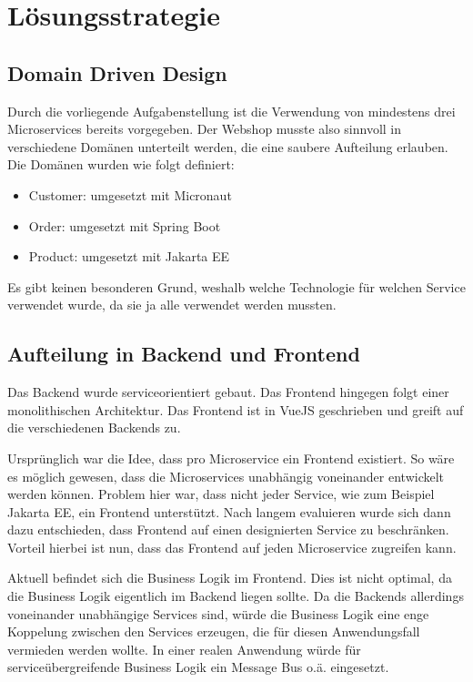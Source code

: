 
\section{Lösungsstrategie}
\label{sec:loesungsstrategie}

\subsection{Domain Driven Design}
Durch die vorliegende Aufgabenstellung ist die Verwendung von mindestens drei Microservices bereits vorgegeben. Der Webshop musste also sinnvoll in verschiedene
Domänen unterteilt werden, die eine saubere Aufteilung erlauben. Die Domänen wurden wie folgt definiert:
\begin{itemize}
    \item Customer: umgesetzt mit Micronaut
    \item Order: umgesetzt mit Spring Boot
    \item Product: umgesetzt mit Jakarta EE
\end{itemize}
    
Es gibt keinen besonderen Grund, weshalb welche Technologie für welchen Service verwendet wurde, da sie ja alle verwendet werden mussten.

\subsection{Aufteilung in Backend und Frontend}
Das Backend wurde serviceorientiert gebaut. Das Frontend hingegen folgt einer monolithischen Architektur. Das Frontend ist in VueJS geschrieben und greift auf die verschiedenen Backends zu.

Ursprünglich war die Idee, dass pro Microservice ein Frontend existiert. So wäre es möglich gewesen, dass die Microservices unabhängig voneinander entwickelt werden können. Problem hier war, dass nicht jeder Service, wie zum Beispiel Jakarta EE, ein Frontend unterstützt. Nach langem evaluieren wurde sich dann dazu entschieden, dass Frontend auf einen designierten Service zu beschränken. Vorteil hierbei ist nun, dass das Frontend auf jeden Microservice zugreifen kann.

Aktuell befindet sich die Business Logik im Frontend. Dies ist nicht optimal, da die Business Logik eigentlich im Backend liegen sollte. Da die Backends allerdings
voneinander unabhängige Services sind, würde die Business Logik eine enge Koppelung zwischen den Services erzeugen, die für diesen Anwendungsfall vermieden werden wollte.
In einer realen Anwendung würde für serviceübergreifende Business Logik ein Message Bus o.ä. eingesetzt.

